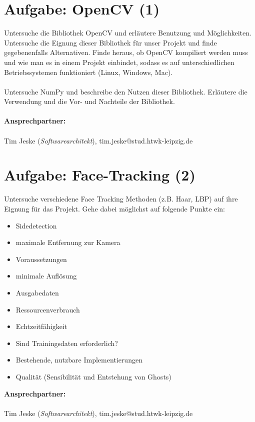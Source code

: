 \documentclass{article}
\begin{document}
\newpage

\section{Aufgabe: OpenCV (1)}
Untersuche die Bibliothek OpenCV und erläutere Benutzung und Möglichkeiten. Untersuche die Eignung dieser Bibliothek für unser Projekt und finde gegebenenfalls Alternativen.
Finde heraus, ob OpenCV kompiliert werden muss und wie man es in einem Projekt einbindet, sodass es auf unterschiedlichen Betriebssystemen funktioniert (Linux, Windows, Mac).
\\\\
Untersuche NumPy und beschreibe den Nutzen dieser Bibliothek. Erläutere die Verwendung und die Vor- und Nachteile der Bibliothek.
\\\\
\textbf{Ansprechpartner:}
\\\\
Tim Jeske (\emph{Softwarearchitekt}), tim.jeske@stud.htwk-leipzig.de
\newpage

\section{Aufgabe: Face-Tracking (2)}
Untersuche verschiedene Face Tracking Methoden (z.B. Haar, LBP) auf ihre Eignung für das Projekt. Gehe dabei möglichst auf folgende Punkte ein:
\begin{itemize}
    \item Sidedetection
    \item maximale Entfernung zur Kamera
    \item Voraussetzungen
    \item minimale Auflösung
    \item Ausgabedaten
    \item Ressourcenverbrauch
    \item Echtzeitfähigkeit
    \item Sind Trainingsdaten erforderlich?
    \item Bestehende, nutzbare Implementierungen
    \item Qualität (Sensibilität und Entstehung von Ghosts)
\end{itemize}
\textbf{Ansprechpartner:}
\\\\
Tim Jeske (\emph{Softwarearchitekt}), tim.jeske@stud.htwk-leipzig.de

\newpage
\end{document}
